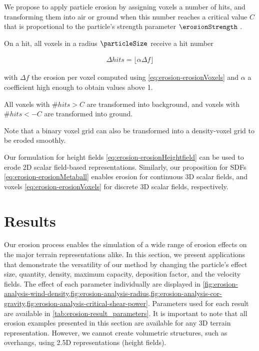 We propose to apply particle erosion by assigning voxels a number of hits, and transforming them into air or ground when this number reaches a critical value $C$ that is proportional to the particle's strength parameter $\erosionStrength$ \cite{Jones2010}. 

On a hit, all voxels in a radius $\particleSize$ receive a hit number 

\begin{align}
    \label{eq:erosion-erosionDiscreteVoxels}
    \Delta hits = \lfloor \alpha \Delta f \rfloor
\end{align}

with $\Delta f$ the erosion per voxel computed using \eqref{eq:erosion-erosionVoxels} and $\alpha$ a coefficient high enough to obtain values above 1. 

All voxels with $\# hits > C$ are transformed into background, and voxels with $\# hits < -C$ are transformed into ground.

Note that a binary voxel grid can also be transformed into a density-voxel grid to be eroded smoothly.

Our formulation for height fields \eqref{eq:erosion-erosionHeightfield} can be used to erode 2D scalar field-based representations. Similarly,  
our proposition for SDFs \eqref{eq:erosion-erosionMetaball} enables erosion for continuous 3D scalar fields, and voxels \eqref{eq:erosion-erosionVoxels} for discrete 3D scalar fields, respectively.


\section{Results}
\label{sec:erosion-erosion-examples}

Our erosion process enables the simulation of a wide range of erosion effects on the major terrain representations alike. In this section, we present applications that demonstrate the versatility of our method by changing the particle's effect size, quantity, density, maximum capacity, deposition factor, and the velocity fields. The effect of each parameter individually are displayed in \cref{fig:erosion-analysis-wind-density,fig:erosion-analysis-radius,fig:erosion-analysis-cor-gravity,fig:erosion-analysis-critical-shear-power}. Parameters used for each result are available in \cref{tab:erosion-result_parameters}.  
It is important to note that all erosion examples presented in this section are available for any 3D terrain representation. However, we cannot create volumetric structures, such as overhangs, using 2.5D representations (height fields).

